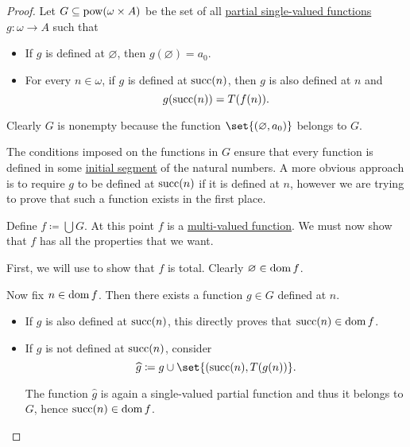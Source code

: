 \begin{proof}
  Let \( G \subseteq \operatorname{pow}(\omega \times A) \) be the set of all \hyperref[def:partial_function]{partial single-valued functions} \( g: \omega \to A \) such that
  \begin{itemize}
    \item If \( g \) is defined at \( \varnothing \), then \( g(\varnothing) = a_0 \).
    \item For every \( n \in \omega \), if \( g \) is defined at \( \operatorname{succ}(n) \), then \( g \) is also defined at \( n \) and
    \begin{equation*}
      g(\operatorname{succ}(n)) = T(f(n)).
    \end{equation*}
  \end{itemize}

  Clearly \( G \) is nonempty because the function \( \set{ (\varnothing, a_0) } \) belongs to \( G \).

  The conditions imposed on the functions in \( G \) ensure that every function is defined in some \hyperref[def:partially_ordered_set_interval/ray]{initial segment} of the natural numbers. A more obvious approach is to require \( g \) to be defined at \( \operatorname{succ}(n) \) if it is defined at \( n \), however we are trying to prove that such a function exists in the first place.

  Define \( f \coloneqq \bigcup G \). At this point \( f \) is a \hyperref[def:multi_valued_function]{multi-valued function}. We must now show that \( f \) has all the properties that we want.

   First, we will use  to show that \( f \) is total. Clearly \( \varnothing \in \operatorname{dom} f \).

  Now fix \( n \in \operatorname{dom} f \). Then there exists a function \( g \in G \) defined at \( n \).

  \begin{itemize}
    \item If \( g \) is also defined at \( \operatorname{succ}(n) \), this directly proves that \( \operatorname{succ}(n) \in \operatorname{dom} f \).
    \item If \( g \) is not defined at \( \operatorname{succ}(n) \), consider
    \begin{equation*}
      \widehat g \coloneqq g \cup \set{ (\op{succ}(n), T(g(n)) }.
    \end{equation*}

    The function \( \widehat g \) is again a single-valued partial function and thus it belongs to \( G \), hence \( \operatorname{succ}(n) \in \operatorname{dom} f \).
  \end{itemize}


\end{proof}
